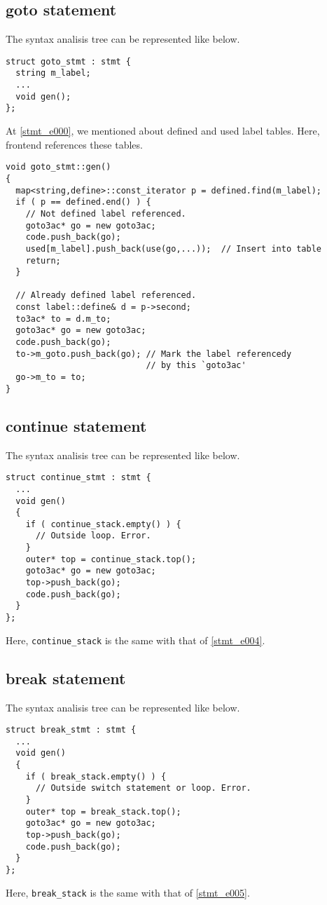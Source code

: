 \subsection{goto statement}
\label{stmt_e001}
The syntax analisis tree can be represented like below.
\begin{verbatim}
struct goto_stmt : stmt {
  string m_label;
  ...
  void gen();
};
\end{verbatim}
At \ref{stmt_e000}, we mentioned about defined and used label tables.
Here, frontend references these tables.
\begin{verbatim}
void goto_stmt::gen()
{
  map<string,define>::const_iterator p = defined.find(m_label);
  if ( p == defined.end() ) {
    // Not defined label referenced.
    goto3ac* go = new goto3ac;
    code.push_back(go);
    used[m_label].push_back(use(go,...));  // Insert into table
    return;
  }

  // Already defined label referenced.
  const label::define& d = p->second;
  to3ac* to = d.m_to;
  goto3ac* go = new goto3ac;
  code.push_back(go);
  to->m_goto.push_back(go); // Mark the label referencedy
                            // by this `goto3ac'
  go->m_to = to;
}
\end{verbatim}

\subsection{continue statement}

The syntax analisis tree can be represented like below.
\begin{verbatim}
struct continue_stmt : stmt {
  ...
  void gen()
  {
    if ( continue_stack.empty() ) {
      // Outside loop. Error.
    }
    outer* top = continue_stack.top();
    goto3ac* go = new goto3ac;
    top->push_back(go);
    code.push_back(go);
  }
};
\end{verbatim}
Here, {\tt{continue\_stack}} is the same
with that of \ref{stmt_e004}. 

\subsection{break statement}

The syntax analisis tree can be represented like below.
\begin{verbatim}
struct break_stmt : stmt {
  ...
  void gen()
  {
    if ( break_stack.empty() ) {
      // Outside switch statement or loop. Error.
    }
    outer* top = break_stack.top();
    goto3ac* go = new goto3ac;
    top->push_back(go);
    code.push_back(go);
  }
};
\end{verbatim}
Here, {\tt{break\_stack}} is the same
with that of \ref{stmt_e005}.

